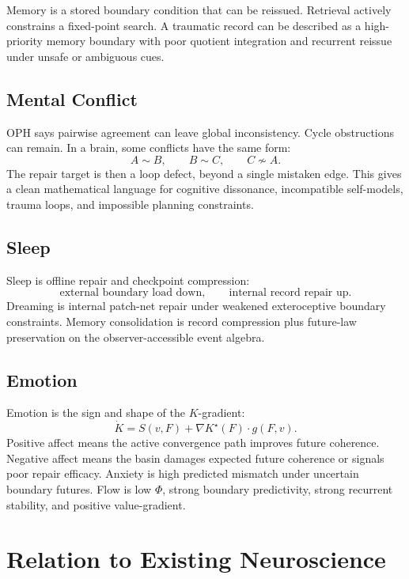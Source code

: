 \documentclass[11pt]{article}
\theoremstyle{remark}
\theoremstyle{plain}
\begin{document}
Memory is a stored boundary condition that can be reissued. Retrieval actively constrains a fixed-point search. A traumatic record can be described as a high-priority memory boundary with poor quotient integration and recurrent reissue under unsafe or ambiguous cues.

\subsection{Mental Conflict}

OPH says pairwise agreement can leave global inconsistency. Cycle obstructions can remain. In a brain, some conflicts have the same form:
\[
A\sim B,\qquad B\sim C,\qquad C\not\sim A.
\]
The repair target is then a loop defect, beyond a single mistaken edge. This gives a clean mathematical language for cognitive dissonance, incompatible self-models, trauma loops, and impossible planning constraints.

\subsection{Sleep}

Sleep is offline repair and checkpoint compression:
\[
\text{external boundary load down},
\qquad
\text{internal record repair up}.
\]
Dreaming is internal patch-net repair under weakened exteroceptive boundary constraints. Memory consolidation is record compression plus future-law preservation on the observer-accessible event algebra.

\subsection{Emotion}

Emotion is the sign and shape of the \(K\)-gradient:
\[
\dot K
=
S(v,F)+\nabla K^\star(F)\cdot g(F,v).
\]
Positive affect means the active convergence path improves future coherence. Negative affect means the basin damages expected future coherence or signals poor repair efficacy. Anxiety is high predicted mismatch under uncertain boundary futures. Flow is low \(\Phi\), strong boundary predictivity, strong recurrent stability, and positive value-gradient.

\section{Relation to Existing Neuroscience}
\end{document}
